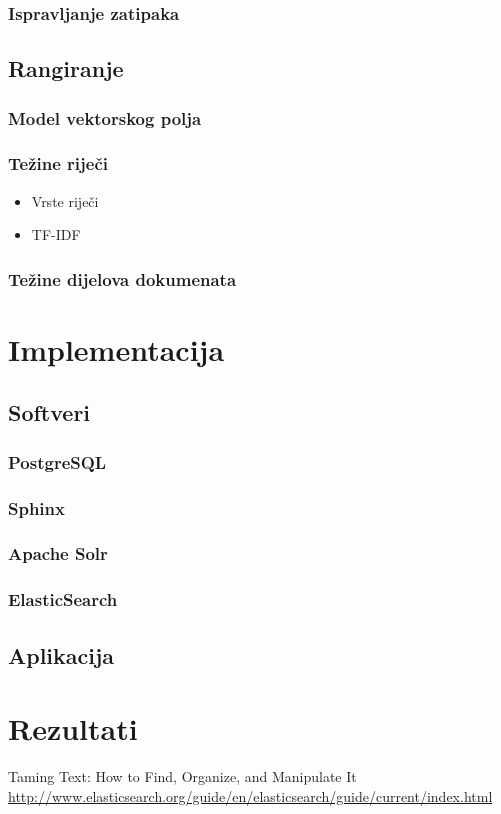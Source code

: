\documentclass[11pt]{scrreprt}
\begin{document}
\subsection{Ispravljanje zatipaka}

\section{Rangiranje}

\subsection{Model vektorskog polja}

\subsection{Težine riječi}

\begin{itemize}
  \item Vrste riječi
  \item TF-IDF
\end{itemize}

\subsection{Težine dijelova dokumenata}

\chapter{Implementacija}

\section{Softveri}

\subsection{PostgreSQL}

\subsection{Sphinx}

\subsection{Apache Solr}

\subsection{ElasticSearch}

\section{Aplikacija}

\chapter{Rezultati}

\begin{thebibliography}{99}
   Taming Text: How to Find, Organize, and Manipulate It
   \url{http://www.elasticsearch.org/guide/en/elasticsearch/guide/current/index.html}
\end{thebibliography}
\end{document}
